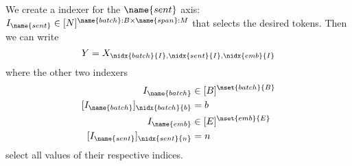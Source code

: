 We create a indexer for the $\name{sent}$ axis: $I_{\name{sent}} \in [N]^{\name{batch}:B \times \name{span}: M}$ that selects the desired tokens. Then we can write
\begin{equation*}
  Y = X_{\nidx{batch}{I}, \nidx{sent}{I}, \nidx{emb}{I}}
\end{equation*}
where the other two indexers
\begin{align*}
  I_{\name{batch}} &\in [B]^{\nset{batch}{B}} \\
  [I_{\name{batch}}]_{\nidx{batch}{b}} &= b \\
  I_{\name{emb}} &\in [E]^{\nset{emb}{E}} \\
  [I_{\name{sent}}]_{\nidx{sent}{n}} &= n
\end{align*}
select all values of their respective indices.

